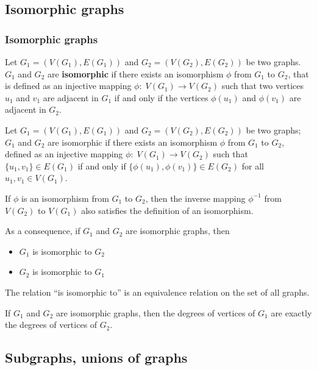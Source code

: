 \documentclass[aspectratio=169]{beamer}
\begin{document}
\subsection{Isomorphic graphs}

\begin{frame} \frametitle{Isomorphic graphs} 
\begin{definition}
Let $G_1=(V(G_1),E(G_1))$ and $G_2=(V(G_2),E(G_2))$ be two graphs.
$G_1$ and $G_2$ are \textbf{isomorphic} if there exists an isomorphism $\phi$ from $G_1$ to $G_2$, that is defined as an injective mapping $\phi:\; V(G_1) \rightarrow V(G_2)$ such that two vertices $u_1$ and $v_1$ are adjacent in $G_1$ if and only if the vertices $\phi(u_1)$ and $\phi(v_1)$ are adjacent in $G_2$.
\end{definition}
\begin{definition}
Let $G_1=(V(G_1),E(G_1))$ and $G_2=(V(G_2),E(G_2))$ be two graphs;
$G_1$ and $G_2$ are isomorphic if there exists an isomorphism $\phi$ from $G_1$ to $G_2$, defined as 
an injective mapping $\phi : \; V(G_1) \rightarrow V(G_2)$ such that $\{u_1,v_1\} \in E(G_1)$ if and only if $\{\phi(u_1),\phi(v_1)\}\in E(G_2)$ for all $u_1, v_1 \in V(G_1)$.
\end{definition}
\end{frame}
 
 
 
\begin{frame}
If $\phi$ is an isomorphism from $G_1$ to $G_2$, then the inverse mapping $\phi ^{-1}$ from $V(G_2)$ to $V(G_1)$ also satisfies the definition of an isomorphism.

As a consequence, if $G_1$ and $G_2$ are isomorphic graphs, then
\begin{itemize}
\item $G_1$ is isomorphic to $G_2$
\item $G_2$ is isomorphic to $G_1$
\end{itemize}
\begin{theorem}
The relation ``is isomorphic to'' is an equivalence relation on the set of all graphs.
\end{theorem}
\begin{theorem}
If $G_1$ and $G_2$ are isomorphic graphs, then the degrees of vertices of $G_1$ are exactly the degrees of vertices of $G_2$.
\end{theorem}
\end{frame}


\subsection{Subgraphs, unions of graphs}
\end{document}
